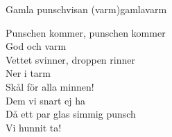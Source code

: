\begin{song}{Gamla punschvisan (varm)}{gamlavarm}
\begin{vers}
Punschen kommer, punschen kommer\\
God och varm\\
Vettet svinner, droppen rinner\\
Ner i tarm\\
Skål för alla minnen!\\
Dem vi snart ej ha\\
Då ett par glas simmig punsch \\
Vi hunnit ta!\\
\end{vers}
\end{song}
